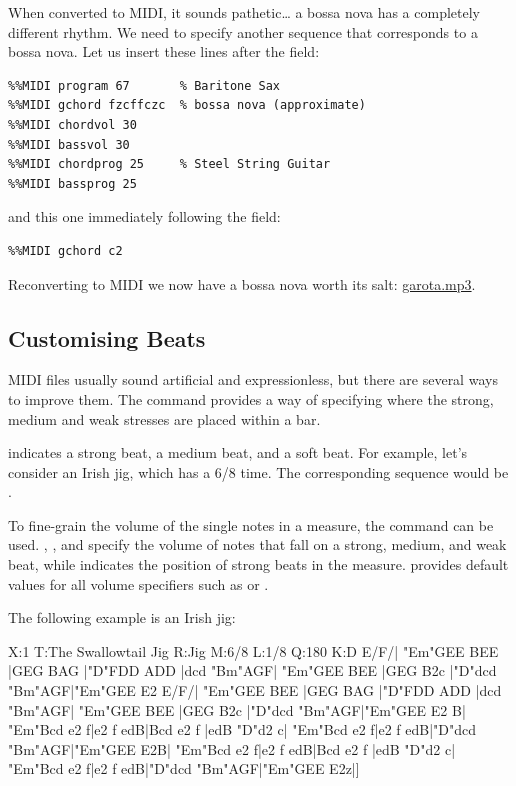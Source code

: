 \documentclass[a4paper,fullpage,12pt]{book}
\begin{document}
When converted to MIDI, it sounds pathetic{\ldots} a bossa nova has a
completely different rhythm. We need to specify another 
sequence that corresponds to a bossa nova. Let us insert these lines
after the  field:

\begin{verbatim}
%%MIDI program 67       % Baritone Sax
%%MIDI gchord fzcffczc  % bossa nova (approximate)
%%MIDI chordvol 30
%%MIDI bassvol 30
%%MIDI chordprog 25     % Steel String Guitar
%%MIDI bassprog 25
\end{verbatim}

and this one immediately following the  field:

\begin{verbatim}
%%MIDI gchord c2
\end{verbatim}

Reconverting to MIDI we now have a bossa nova worth its salt:
\href{run:garota.mp3}{garota.mp3}.


\subsection{Customising Beats}

MIDI files usually sound artificial and expressionless, but there are
several ways to improve them. The command  provides a way of specifying where the strong, medium and
weak stresses are placed within a bar.

 indicates a strong beat,  a medium beat, and  a
soft beat. For example, let's consider an Irish jig, which has a 6/8
time. The corresponding  sequence would be .

To fine-grain the volume of the single notes in a measure, the
command can be used. , , and  specify
the volume of notes that fall on a strong, medium, and weak beat,
while  indicates the position of strong beats in the measure.
\abcmid{} provides default values for all volume specifiers such as
 or .

The following example is an Irish jig:

\begin{abcsource}
X:1
T:The Swallowtail Jig
R:Jig
M:6/8
L:1/8
Q:180
K:D
E/F/|
"Em"GEE BEE |GEG BAG |"D"FDD ADD    |dcd "Bm"AGF|
"Em"GEE BEE |GEG B2c |"D"dcd "Bm"AGF|"Em"GEE E2 E/F/|
"Em"GEE BEE |GEG BAG |"D"FDD ADD    |dcd "Bm"AGF|
"Em"GEE BEE |GEG B2c |"D"dcd "Bm"AGF|"Em"GEE E2 B|
"Em"Bcd e2 f|e2 f edB|Bcd e2 f      |edB "D"d2 c|
"Em"Bcd e2 f|e2 f edB|"D"dcd "Bm"AGF|"Em"GEE E2B|
"Em"Bcd e2 f|e2 f edB|Bcd e2 f      |edB "D"d2 c|
"Em"Bcd e2 f|e2 f edB|"D"dcd "Bm"AGF|"Em"GEE E2z|]
\end{abcsource}
\end{document}
